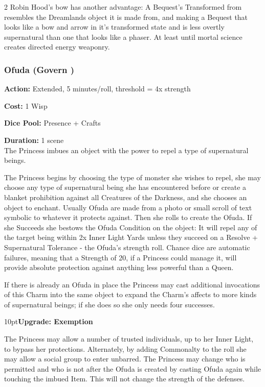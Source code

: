 \begin{multicols}{2}
Robin Hood's bow has another advantage: A Bequest's Transformed from resembles the Dreamlands object it is made from, and making a Bequest that looks like a bow and arrow in it's transformed state and is less overtly supernatural than one that looks like a phaser. At least until mortal science creates directed energy weaponry. 
\bigsidebarend

\subsubsection*{Ofuda (Govern \textbullet\textbullet\textbullet)}

\noindent \textbf{Action:} Extended, 5 minutes/roll, threshold = 4x strength

\noindent \textbf{Cost:} 1 Wisp

\noindent \textbf{Dice Pool:} Presence + Crafts

\noindent \textbf{Duration:} 1 scene \\

\noindent The Princess imbues an object with the power to repel a type of supernatural beings.

The Princess begins by choosing the type of monster she wishes to repel, she may choose any type of supernatural being she has encountered before or create a blanket prohibition against all Creatures of the Darkness, and she chooses an object to enchant. Usually Ofuda are made from a photo or small scroll of text symbolic to whatever it protects against. Then she rolls to create the Ofuda. If she Succeeds she bestows the Ofuda Condition on the object: It will repel any of the target being within 2x Inner Light Yards unless they succeed on a Resolve + Supernatural Tolerance - the Ofuda’s strength roll. Chance dice are automatic failures, meaning that a Strength of 20, if a Princess could manage it, will provide absolute protection against anything less powerful than a Queen.  

If there is already an Ofuda in place the Princess may cast additional invocations of this Charm into the same object to expand the Charm's affects to more kinds of supernatural beings; if she does so she only needs four successes.

\begin{myindentpar}{10pt}\textbf{Upgrade: Exemption}

The Princess may allow a number of trusted individuals, up to her Inner Light, to bypass her protections. Alternately, by adding Commonalty to the roll she may allow a social group to enter unbarred. The Princess may change who is permitted and who is not after the Ofuda is created by casting Ofuda again while touching the imbued Item. This will not change the strength of the defenses.


\end{myindentpar}
\end{multicols}
